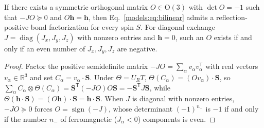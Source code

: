 \begin{proposition}
    \label{models:prop:xyz}
    If there exists a symmetric orthogonal matrix $O\in\mathrm O(3)$ with
    $\det O=-1$ such that $-JO\succeq0$ and $O\bm h=\bm h$, then
    Eq.~\eqref{models:eq:bilinear} admits a reflection-positive bond
    factorization for every spin $S$. For diagonal exchange
    $J=\operatorname{diag}(J_x,J_y,J_z)$ with nonzero entries and $\bm h=0$,
    such an $O$ exists if and only if an even number of $J_x,J_y,J_z$ are
    negative.
\end{proposition}

\begin{proof}
    Factor the positive semidefinite matrix $-JO=\sum_\alpha v_\alpha v_\alpha^{\mathsf T}$
    with real vectors $v_\alpha\in\mathbb R^3$ and set
    $C_\alpha=v_\alpha\cdot\bm S$. Under $\Theta=U_RT$,
    $\Theta(C_\alpha)=(Ov_\alpha)\cdot\bm S$, so
    $\sum_\alpha C_\alpha\otimes\Theta(C_\alpha)
        =\bm S^{\mathsf T}(-JO)O\bm S=-\bm S^{\mathsf T}J\bm S$, while
    $\Theta(\bm h\cdot\bm S)=(O\bm h)\cdot\bm S=\bm h\cdot\bm S$. When $J$
    is diagonal with nonzero entries, $-JO\succeq0$ forces
    $O=\operatorname{sign}(-J)$, whose determinant $(-1)^{n_-}$ is $-1$ if
    and only if the number $n_-$ of ferromagnetic ($J_\alpha<0$) components
    is even.
\end{proof}

